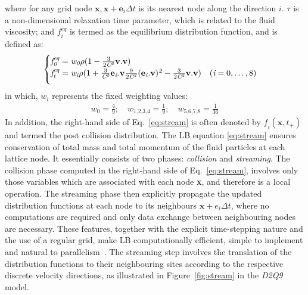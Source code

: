 where for any grid node $\mathbf{x},\mathbf{x}+\mathbf{e}_{\textit{i}} \Delta t$ is its nearest node along the direction $\textit{i}$. $\tau$ is a non-dimensional relaxation time parameter, which is related to the fluid viscosity; and $\textit{f}_{\textit{i}}^{\textit{eq}}$ is termed as the equilibrium distribution function, and is defined as:
\begin{align}
\begin{cases}
\textit{f}_{\textit{0}}^{\textit{eq}}=\textit{w}_{\textit{0}} \rho (1 - \frac{3}{2\textit{C}^{\textit{2}}}\mathbf{v}.\mathbf{v}) \\ 
\vspace*{2mm}
\textit{f}_{\textit{i}}^{\textit{eq}}=\textit{w}_{\textit{i}} \rho (1 + \frac{3}{\textit{C}^{\textit{2}}}\mathbf{e}_{\textit{i}}.\mathbf{v} \frac{9}{2\textit{C}^{\textit{2}}} (\mathbf{e}_{\textit{i}}.\mathbf{v})^{\textit{2}}-\frac{3}{2 \textit{C}^{\textit{2}}}\mathbf{v}.\mathbf{v}) \quad (\textit{i}=0,\dots,8)
\end{cases}
\end{align}
in which, $\textit{w}_{\textit{i}}$ represents the fixed weighting values:
\begin{align}
\textit{w}_{\textit{0}} = \frac{4}{9}; \quad \textit{w}_{\textit{1,2,3,4}}= \frac{1}{9}; \quad \textit{w}_{\textit{5,6,7,8}}= \frac{1}{36}
\end{align}
In addition, the right-hand side of Eq.~\ref{eq:stream} is often denoted by $\textit{f}_{\textit{i}}(\mathbf{x}, \textit{t}_{+})$ and termed the post collision distribution. The LB equation \ref{eq:stream} ensures conservation of total mass and total momentum of the fluid particles at each lattice node. It essentially consists of two phases: \textit{collision} and \textit{streaming}. The collision phase computed in the right-hand side of Eq.~\ref{eq:stream}, involves only those variables which are associated with each node \textbf{x}, and therefore is a local operation. The streaming phase then explicitly propagate the updated distribution functions at each node to its neighbours $\mathbf{x}+\mathbf{\textit{e}}_{\textit{i}} \Delta t$, where no computations are required and only data exchange between neighbouring nodes are necessary. These features, together with the explicit time-stepping nature and the use of a regular grid, make LB computationally efficient, simple to implement and natural to parallelism~\citep{han2007}. The streaming step involves the translation of the distribution functions to their neighbouring sites according to the respective discrete velocity directions, as illustrated in Figure~\ref{fig:stream} in the \textit{D2Q9} model. 
